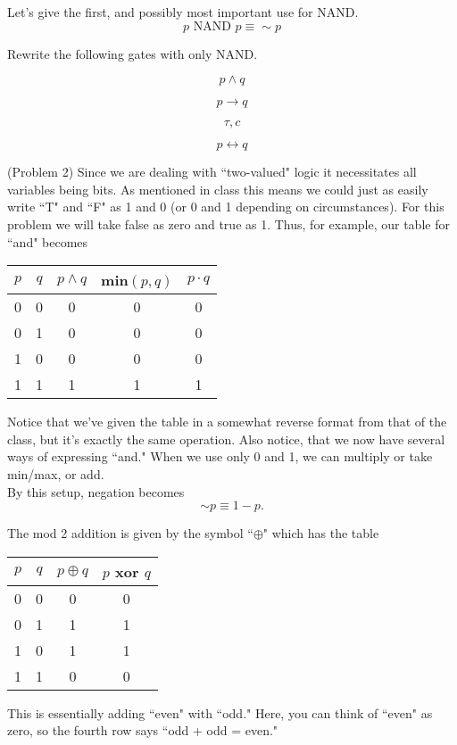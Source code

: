 \documentclass[16 pt]{amsart}
\theoremstyle{definition}
\theoremstyle{remark}
\numberwithin{equation}{subsection}
\begin{document}
Let's give the first, and possibly most important use for NAND.
\[
p \text{ NAND } p \equiv \sim p
\]

Rewrite the following gates with only NAND.  

\[
p \wedge q
\]

\[
p \rightarrow q
\]

\[
\tau, c
\]

\[
p \leftrightarrow q
\]

\newpage

(Problem 2) Since we are dealing with ``two-valued" logic it necessitates all variables being bits.  As mentioned in class this means we could just as easily write ``T" and ``F" as 1 and 0 (or 0 and 1 depending on circumstances).  For this problem we will take false as zero and true as 1.  Thus, for example, our table for ``and" becomes

\begin{center}
\begin{tabular}{c | c | c | c | c }
$p$ & $q$ & $p\wedge q$ & min$(p,q)$ & $p\cdot q$\\ 
\hline
0 & 0 & 0 & 0 & 0\\
0 & 1 & 0 & 0 & 0\\
1 & 0 & 0 & 0 & 0\\
1 & 1 & 1 & 1 & 1
\end{tabular}
\end{center}


Notice that we've given the table in a somewhat reverse format from that of the class, but it's exactly the same operation.  Also notice, that we now have several ways of expressing ``and." When we use only 0 and 1, we can multiply or take min/max, or add.\\

By this setup, negation becomes
\[
\sim p \equiv 1 - p.
\]

The mod 2 addition is given by the symbol ``$\oplus$" which has the table

\begin{center}
\begin{tabular}{c | c | c | c }
$p$ & $q$ & $p\oplus q$ & $p$ xor $q$\\ 
\hline
0 & 0 & 0 & 0 \\
0 & 1 & 1 & 1 \\
1 & 0 & 1 & 1 \\
1 & 1 & 0 & 0 
\end{tabular}
\end{center}

This is essentially adding ``even" with ``odd." Here, you can think of ``even" as zero, so the fourth row says ``odd + odd = even."\\
\end{document}
